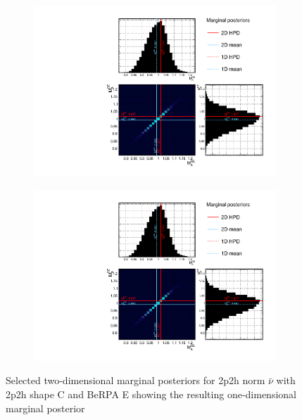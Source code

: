 \begin{figure}[h]
	\begin{subfigure}[t]{0.49\textwidth}
		\includegraphics[width=\textwidth, trim={0mm 0mm 0mm 0mm}, clip,page=55]{figures/mach3/mcmc/2017b_NewDet_3Xsec_4Det_5Flux_NewXSecTune_Asimov_merge_marg_xsec}
	\end{subfigure}
	\begin{subfigure}[t]{0.49\textwidth}
		\includegraphics[width=\textwidth, trim={0mm 0mm 0mm 0mm}, clip,page=60]{figures/mach3/mcmc/2017b_NewDet_3Xsec_4Det_5Flux_NewXSecTune_Asimov_merge_marg_xsec}
	\end{subfigure}
	\caption{Selected two-dimensional marginal posteriors for 2p2h norm $\bar{\nu}$ with 2p2h shape C and BeRPA E showing the resulting one-dimensional marginal posterior}
	\label{fig:marginalisation_2p2h_norm_nubar}
\end{figure}

